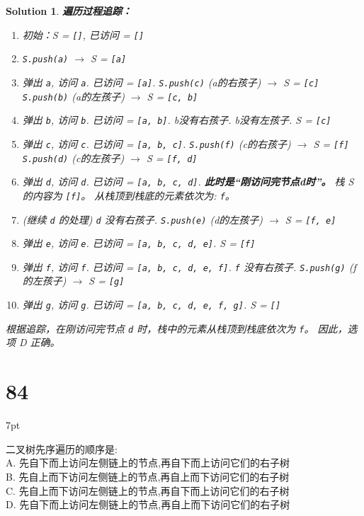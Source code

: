 \documentclass[UTF8]{report}
\newtheorem{solution}{Solution}
\theoremstyle{MyLineTheoremStyle} %
\theoremstyle{MyBlockTheoremStyle} %
\theoremstyle{MySubsubsectionStyle} %
\newenvironment{graybox}{%
        \def\FrameCommand{%
        \hspace{1pt}%
        {\color{gray}\small \vrule width 2pt}%
        {\color{graybox_color}\vrule width 4pt}%
        \colorbox{graybox_color}%
        }%
        \MakeFramed{\advance\hsize-\width\FrameRestore}%
        \noindent\hspace{-4.55pt}%
        \begin{adjustwidth}{}{7pt}%
        \vspace{2pt}\vspace{2pt}%
        }
        {%
        \vspace{2pt}\end{adjustwidth}\endMakeFramed%
        }
\begin{document}
\begin{solution}
\textbf{遍历过程追踪：}
\begin{enumerate}
    \item 初始：S = \texttt{[]}, 已访问 = \texttt{[]}
    \item \texttt{S.push(a)} $\rightarrow$ S = \texttt{[a]}
    \item 弹出 \texttt{a}, 访问 \texttt{a}. 已访问 = \texttt{[a]}.
          \texttt{S.push(c)} (a的右孩子) $\rightarrow$ S = \texttt{[c]}
          \texttt{S.push(b)} (a的左孩子) $\rightarrow$ S = \texttt{[c, b]}
    \item 弹出 \texttt{b}, 访问 \texttt{b}. 已访问 = \texttt{[a, b]}.
          b没有右孩子.
          b没有左孩子.
          S = \texttt{[c]}
    \item 弹出 \texttt{c}, 访问 \texttt{c}. 已访问 = \texttt{[a, b, c]}.
          \texttt{S.push(f)} (c的右孩子) $\rightarrow$ S = \texttt{[f]}
          \texttt{S.push(d)} (c的左孩子) $\rightarrow$ S = \texttt{[f, d]}
    \item 弹出 \texttt{d}, 访问 \texttt{d}. 已访问 = \texttt{[a, b, c, d]}.
          \textbf{此时是“刚访问完节点d时”。}
          栈 S 的内容为 \texttt{[f]}。
          从栈顶到栈底的元素依次为: \texttt{f}。
    \item (继续 \texttt{d} 的处理)
          \texttt{d} 没有右孩子.
          \texttt{S.push(e)} (d的左孩子) $\rightarrow$ S = \texttt{[f, e]}
    \item 弹出 \texttt{e}, 访问 \texttt{e}. 已访问 = \texttt{[a, b, c, d, e]}.
          S = \texttt{[f]}
    \item 弹出 \texttt{f}, 访问 \texttt{f}. 已访问 = \texttt{[a, b, c, d, e, f]}.
          \texttt{f} 没有右孩子.
          \texttt{S.push(g)} (f的左孩子) $\rightarrow$ S = \texttt{[g]}
    \item 弹出 \texttt{g}, 访问 \texttt{g}. 已访问 = \texttt{[a, b, c, d, e, f, g]}.
          S = \texttt{[]}
\end{enumerate}
根据追踪，在刚访问完节点 \texttt{d} 时，栈中的元素从栈顶到栈底依次为 \texttt{f}。
因此，选项 D 正确。
\end{solution}


\section*{84}
\begin{graybox}
二叉树先序遍历的顺序是: \\
A. 先自下而上访问左侧链上的节点,再自下而上访问它们的右子树 \\
B. 先自上而下访问左侧链上的节点,再自上而下访问它们的右子树 \\
C. 先自上而下访问左侧链上的节点,再自下而上访问它们的右子树 \\
D. 先自下而上访问左侧链上的节点,再自上而下访问它们的右子树
\end{graybox}
\end{document}
